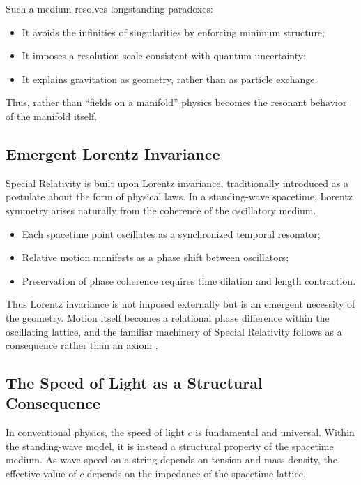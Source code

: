 \documentclass[12pt]{article}
\begin{document}
Such a medium resolves longstanding paradoxes:

\begin{itemize}
  \item It avoids the infinities of singularities by enforcing minimum structure;
  \item It imposes a resolution scale consistent with quantum uncertainty;
  \item It explains gravitation as geometry, rather than as particle exchange.
\end{itemize}

Thus, rather than “fields on a manifold” physics becomes the resonant behavior of the manifold itself.

\subsection{Emergent Lorentz Invariance}

Special Relativity is built upon Lorentz invariance, traditionally introduced as a postulate about the form of physical laws. In a standing-wave spacetime, Lorentz symmetry arises naturally from the coherence of the oscillatory medium.

\begin{itemize}
  \item Each spacetime point oscillates as a synchronized temporal resonator;
  \item Relative motion manifests as a phase shift between oscillators;
  \item Preservation of phase coherence requires time dilation and length contraction.
\end{itemize}

Thus Lorentz invariance is not imposed externally but is an emergent necessity of the geometry. Motion itself becomes a relational phase difference within the oscillating lattice, and the familiar machinery of Special Relativity follows as a consequence rather than an axiom \cite{einstein1905}.

\subsection{The Speed of Light as a Structural Consequence}

In conventional physics, the speed of light \( c \) is fundamental and universal. Within the standing-wave model, it is instead a structural property of the spacetime medium. As wave speed on a string depends on tension and mass density, the effective value of \( c \) depends on the impedance of the spacetime lattice.
\end{document}
